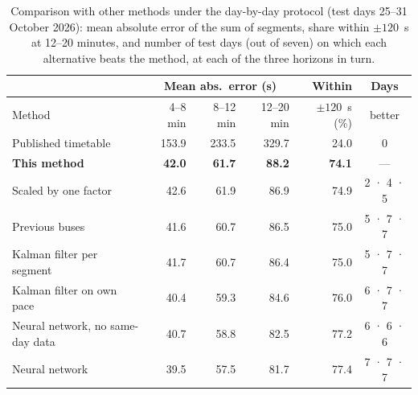 \begin{table}[t]
\centering
\caption{Comparison with other methods under the day-by-day protocol (test days 25--31 October 2026): mean absolute
error of the sum of segments, share within $\pm120$~s at 12--20 minutes, and number of test days (out of seven) on
which each alternative beats the method, at each of the three horizons in turn.}
\label{tab:methods}
\footnotesize
\setlength{\tabcolsep}{4pt}
\begin{tabular}{@{}>{\raggedright\arraybackslash}p{3.2cm}rrrrc@{}}
\toprule
& \multicolumn{3}{c}{Mean abs.\ error (s)} & Within & Days \\
\cmidrule(lr){2-4}
Method & 4--8 min & 8--12 min & 12--20 min & $\pm120$~s (\%) & better \\
\midrule
Published timetable & 153.9 & 233.5 & 329.7 & 24.0 & 0 \\
\textbf{This method} & \textbf{42.0} & \textbf{61.7} & \textbf{88.2} & \textbf{74.1} & --- \\
Scaled by one factor & 42.6 & 61.9 & 86.9 & 74.9 & 2 · 4 · 5 \\
Previous buses & 41.6 & 60.7 & 86.5 & 75.0 & 5 · 7 · 7 \\
Kalman filter per segment & 41.7 & 60.7 & 86.4 & 75.0 & 5 · 7 · 7 \\
Kalman filter on own pace & 40.4 & 59.3 & 84.6 & 76.0 & 6 · 7 · 7 \\
Neural network, no same-day data & 40.7 & 58.8 & 82.5 & 77.2 & 6 · 6 · 6 \\
Neural network & 39.5 & 57.5 & 81.7 & 77.4 & 7 · 7 · 7 \\
\bottomrule
\end{tabular}
\end{table}

